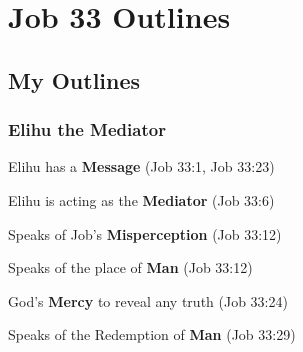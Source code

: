 \section{Job 33 Outlines}

\subsection{My Outlines}

\subsubsection{Elihu the Mediator}

\begin{compactenum}[I.][7]
    \item Elihu has a \textbf{Message}  (Job 33:1, Job 33:23)
    \item Elihu is acting as the \textbf{Mediator}  (Job 33:6)
    \item Speaks of Job's \textbf{Misperception}  (Job 33:12)      \item Speaks of the place of \textbf{Man}  (Job 33:12)    \item God's \textbf{Mercy} to reveal any truth (Job 33:24)
    \item Speaks of the Redemption of \textbf{Man}  (Job 33:29)
\end{compactenum}


